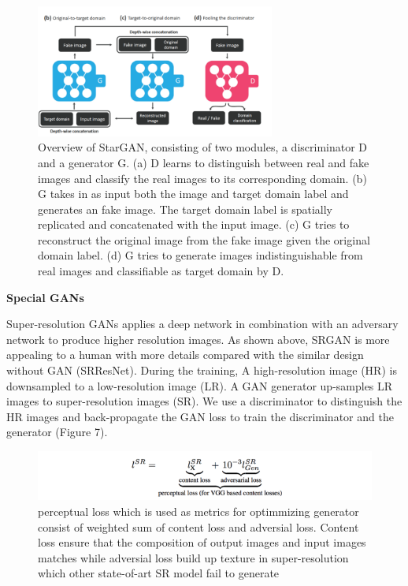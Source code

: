\documentclass{article}
\begin{document}
\begin{figure}[h]
    \centering
    \includegraphics[width=0.7\textwidth]{images/style_stargan.png}
    \caption{Overview of StarGAN, consisting of two modules, a discriminator D and a generator G. (a) D learns to distinguish between
real and fake images and classify the real images to its corresponding domain. (b) G takes in as input both the image and target domain
label and generates an fake image. The target domain label is spatially replicated and concatenated with the input image. (c) G tries to
reconstruct the original image from the fake image given the original domain label. (d) G tries to generate images indistinguishable from
real images and classifiable as target domain by D.}
    \label{fig:mesh1}
\end{figure}
\medskip



\medskip
\begin{center}
    {\Large{\textbf{Special GANs}}}
\end{center}

Super-resolution GANs applies a deep network in combination with an adversary network to produce higher resolution images. As shown above, SRGAN is more appealing to a human with more details compared with the similar design without GAN (SRResNet). During the training, A high-resolution image (HR) is downsampled to a low-resolution image (LR). A GAN generator up-samples LR images to super-resolution images (SR). We use a discriminator to distinguish the HR images and back-propagate the GAN loss to train the discriminator and the generator (Figure 7).

\begin{figure}[h]
    \centering
    \includegraphics[width=.6\textwidth]{images/special_srganloss.png}
    \caption{perceptual loss which is used as metrics for optimmizing generator consist of weighted sum of content loss and adversial loss. Content loss ensure that the composition of output images and input images matches while adversial loss build up texture in super-resolution which other state-of-art SR model fail to generate}
    \label{fig:mesh1}
\end{figure}
\end{document}
